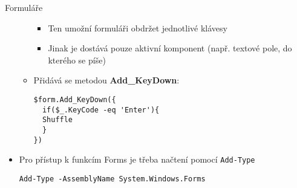 \documentclass[main.tex]{subfiles}
\begin{document}
\begin{frame}{Formuláře}
\begin{itemize}
\begin{itemize}
        \begin{itemize}
          \item Ten umožní formuláři obdržet jednotlivé klávesy
          \item Jinak je dostává pouze aktivní komponent (např. textové pole, do kterého se píše)
        \end{itemize}
        \framebreak
      \item Přidává se metodou \textbf{Add\_KeyDown}:
\begin{verbatim}
$form.Add_KeyDown({
  if($_.KeyCode -eq 'Enter'){
  Shuffle
  }
})
\end{verbatim}
\end{itemize}
\end{itemize}
\vspace{3mm}
\begin{itemize}
  \item Pro přístup k funkcím Forms je třeba načtení pomocí \texttt{Add-Type}
\begin{verbatim}
Add-Type -AssemblyName System.Windows.Forms
\end{verbatim}
\end{itemize}
\end{frame}
\end{document}
